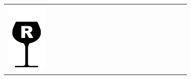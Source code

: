 {\begin{center}
\begin{tabular}{ >{\centering\arraybackslash}p{0.18\linewidth}  >{\centering\arraybackslash}p{0.18\linewidth}  >{\centering\arraybackslash}p{0.18\linewidth}  >{\centering\arraybackslash}p{0.19\linewidth}}
\includegraphics[scale=0.021, trim= 0em -5em -5em -5em,]{Icones/icon_rhone_black.pdf}
&

\end{tabular}
\end{center}}
